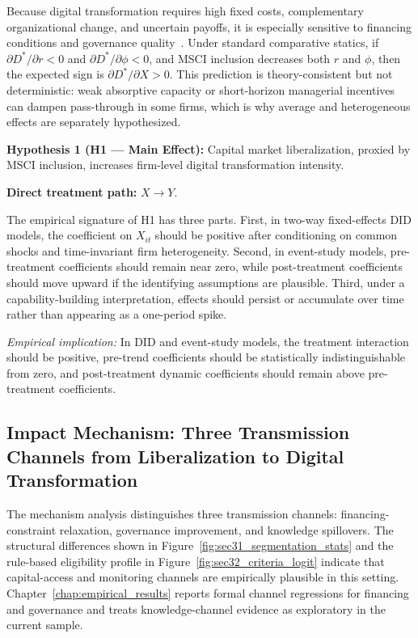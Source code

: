 Because digital transformation requires high fixed costs, complementary organizational change, and uncertain payoffs, it is especially sensitive to financing conditions and governance quality~\cite{Yang2023,Verhoef2021,XueZhang2024}. Under standard comparative statics, if $\partial D^*/\partial r < 0$ and $\partial D^*/\partial \phi < 0$, and MSCI inclusion decreases both $r$ and $\phi$, then the expected sign is $\partial D^*/\partial X > 0$. This prediction is theory-consistent but not deterministic: weak absorptive capacity or short-horizon managerial incentives can dampen pass-through in some firms, which is why average and heterogeneous effects are separately hypothesized.

\textbf{Hypothesis 1 (H1 --- Main Effect):} Capital market liberalization, proxied by MSCI inclusion, increases firm-level digital transformation intensity.

\textbf{Direct treatment path:} $X \rightarrow Y$.

The empirical signature of H1 has three parts. First, in two-way fixed-effects DID models, the coefficient on $X_{it}$ should be positive after conditioning on common shocks and time-invariant firm heterogeneity. Second, in event-study models, pre-treatment coefficients should remain near zero, while post-treatment coefficients should move upward if the identifying assumptions are plausible. Third, under a capability-building interpretation, effects should persist or accumulate over time rather than appearing as a one-period spike.

\emph{Empirical implication:} In DID and event-study models, the treatment interaction should be positive, pre-trend coefficients should be statistically indistinguishable from zero, and post-treatment dynamic coefficients should remain above pre-treatment coefficients.

\subsection{Impact Mechanism: Three Transmission Channels from Liberalization to Digital Transformation}

The mechanism analysis distinguishes three transmission channels: financing-constraint relaxation, governance improvement, and knowledge spillovers. The structural differences shown in Figure~\ref{fig:sec31_segmentation_stats} and the rule-based eligibility profile in Figure~\ref{fig:sec32_criteria_logit} indicate that capital-access and monitoring channels are empirically plausible in this setting. Chapter~\ref{chap:empirical_results} reports formal channel regressions for financing and governance and treats knowledge-channel evidence as exploratory in the current sample.

